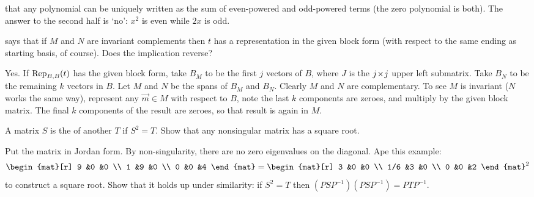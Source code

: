 \begin{exercises}
\begin{answer}
      that any polynomial can be uniquely
       written as the sum of even-powered and odd-powered terms (the
       zero polynomial is both).
       The answer to the second half is `no': \( x^2 \) is even while
       \( 2x \) is odd.  
     \end{answer}
  \item 
     says that if \( M \) and
    \( N \) are
    invariant complements then \( t \) has a representation in the given
    block form (with respect to the same ending as starting basis, of course).
    Does the implication reverse?
    \begin{answer}
      Yes.
      If \( \rep{t}{B,B} \) has the given block form, take \( B_M \) to
      be the first \( j \) vectors of \( B \), where \( J \) is the
      \( \nbyn{j} \) upper left submatrix.
      Take \( B_N \) to be the remaining \( k \) vectors in \( B \).
      Let \( M \) and \( N \) be the spans of \( B_M \) and \( B_N \).
      Clearly \( M \) and \( N \) are complementary.
      To see \( M \) is invariant (\( N \) works the same way), represent
      any \( \vec{m}\in M \) with respect to \( B \), note the last
      \( k \) components are zeroes, and multiply by the given block
      matrix.
      The final \( k \) components of the result are zeroes, so that
      result is again in \( M \). 
     \end{answer}
   \item 
     A matrix \( S \) is the 
     of another \( T \) if \( S^2=T \).
     Show that any nonsingular matrix has a square root.
     \begin{answer}
         Put the matrix in Jordan form.
         By non-singularity, there are no zero eigenvalues on the diagonal.
         Ape this example:
          \begin{equation*}
             \begin{mat}[r]
                9  &0  &0 \\
                1  &9  &0 \\
                0  &0  &4
             \end{mat}
             =
             \begin{mat}[r]
                3  &0  &0 \\
               1/6 &3  &0 \\
                0  &0  &2
             \end{mat}^2
          \end{equation*}
         to construct a square root.
         Show that it holds up under similarity: if \( S^2=T \) then
         \( (PSP^{-1})(PSP^{-1})=PTP^{-1} \). 
    \end{answer}
\end{exercises}
